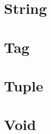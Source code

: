 \section{String}
\section{Tag}
\section{Tuple}
\section{Void}
\label{sec:std-void}

\let\section\sectionOrig
